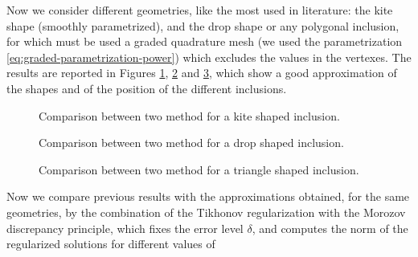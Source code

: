 Now we consider different geometries, like the most used in literature: the kite shape (smoothly parametrized), 
and the drop shape or any polygonal inclusion, for which must be used a graded quadrature mesh 
(we used the parametrization \eqref{eq:graded-parametrization-power}) which excludes the values in the vertexes. 
The results are reported in Figures \ref{fig:first_compare_kite}, \ref{fig:first_compare_drop} 
and \ref{fig:first_compare_triangle}, which show a good approximation of the shapes and 
of the position of the different inclusions. 
\begin{center}
\begin{figure}[]%
\caption{Comparison between two method for a kite shaped inclusion.}
\label{fig:first_compare_kite}
\end{figure}
\end{center}
\begin{center}
\begin{figure}%
\caption{Comparison between two method for a drop shaped inclusion.}
\label{fig:first_compare_drop}
\end{figure}
\end{center}
\begin{center}
\begin{figure}%
\caption{Comparison between two method for a triangle shaped inclusion.}
\label{fig:first_compare_triangle}
\end{figure}
\end{center}
Now we compare previous results with the approximations obtained, for the same geometries, by the 
combination of the Tikhonov regularization with the Morozov discrepancy principle, which fixes the 
error level $\delta$, and computes the norm of the regularized solutions for different values of 
